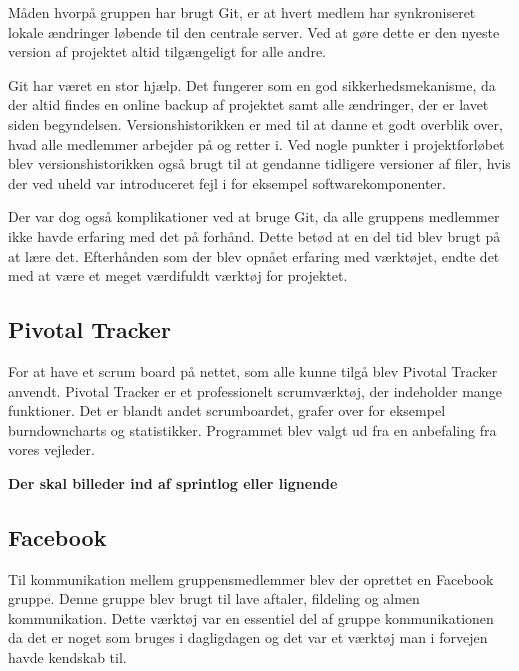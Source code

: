 \noindent Måden hvorpå gruppen har brugt Git, er at hvert medlem har synkroniseret lokale ændringer løbende til den centrale server. Ved at gøre dette er den nyeste version af projektet altid tilgængeligt for alle andre. \newline

\noindent Git har været en stor hjælp. Det fungerer som en god sikkerhedsmekanisme, da der altid findes en online backup af projektet samt alle ændringer, der er lavet siden begyndelsen. Versionshistorikken er med til at danne et godt overblik over, hvad alle medlemmer arbejder på og retter i. Ved nogle punkter i projektforløbet blev versionshistorikken også brugt til at gendanne tidligere versioner af filer, hvis der ved uheld var introduceret fejl i for eksempel softwarekomponenter. \newline

\noindent Der var dog også komplikationer ved at bruge Git, da alle gruppens medlemmer ikke havde erfaring med det på forhånd. Dette betød at en del tid blev brugt på at lære det. Efterhånden som der blev opnået erfaring med værktøjet, endte det med at være et meget værdifuldt værktøj for projektet.  

\subsection{Pivotal Tracker}
\label{section:pivotalTracker}
For at have et scrum board på nettet, som alle kunne tilgå blev Pivotal Tracker anvendt. Pivotal Tracker er et professionelt scrumværktøj, der indeholder mange funktioner. Det er blandt andet scrumboardet, grafer over for eksempel burndowncharts og statistikker. Programmet blev valgt ud fra en anbefaling fra vores vejleder.

\textbf{Der skal billeder ind af sprintlog eller lignende} 

\subsection{Facebook}
Til kommunikation mellem gruppensmedlemmer blev der oprettet en Facebook gruppe. Denne gruppe blev brugt til lave aftaler, fildeling og almen kommunikation. Dette værktøj var en essentiel del af gruppe kommunikationen da det er noget som bruges i dagligdagen og det var et værktøj man i forvejen havde kendskab til. \newline

